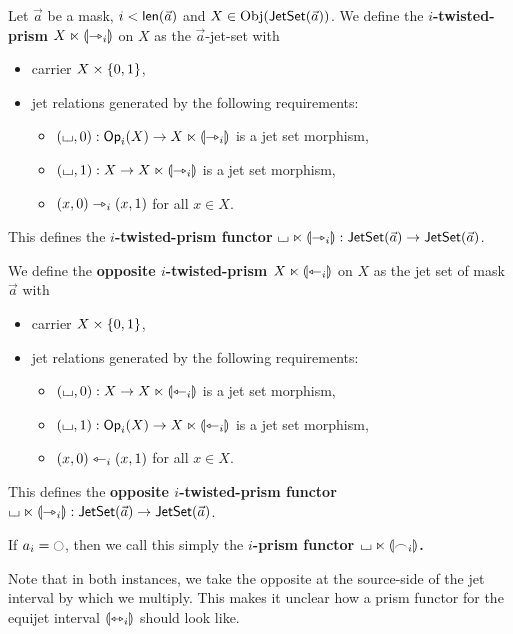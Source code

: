 \documentclass[a4paper]{article}
\begin{document}
\begin{definition} \label{def:prism}
	Let $\vec a$ be a mask, $i < \mathsf{len}(\vec a)$ and $X \in \mathrm{Obj}(\mathsf{JetSet}(\vec a))$.
	We define the \textbf{$i$-twisted-prism $X \ltimes {\llparenthesis \rightarrowtriangle_i \rrparenthesis}$} on $X$ as the $\vec a$-jet-set with
	\begin{itemize}
		\item carrier $X \times \mathopen{}\left\{ 0, 1 \right\}\mathclose{}$,
		\item jet relations generated by the following requirements:
		\begin{itemize}
			\item $({\llcorner\hspace{-.4ex}\lrcorner}, 0) : {\mathsf{Op}}_i(X) \to X \ltimes {\llparenthesis \rightarrowtriangle_i \rrparenthesis}$ is a jet set morphism,
			\item $({\llcorner\hspace{-.4ex}\lrcorner}, 1) : X \to X \ltimes {\llparenthesis \rightarrowtriangle_i \rrparenthesis}$ is a jet set morphism,
			\item $(x, 0) \rightarrowtriangle_i (x, 1)$ for all $x \in X$.
		\end{itemize}
	\end{itemize}
	This defines the \textbf{$i$-twisted-prism functor} ${\llcorner\hspace{-.4ex}\lrcorner} \ltimes {\llparenthesis \rightarrowtriangle_i \rrparenthesis} : \mathsf{JetSet}(\vec a) \to \mathsf{JetSet}(\vec a)$.
	
	We define the \textbf{opposite $i$-twisted-prism $X \ltimes {\llparenthesis \leftarrowtriangle_i \rrparenthesis}$} on $X$ as the jet set of mask $\vec a$ with
	\begin{itemize}
		\item carrier $X \times \mathopen{}\left\{ 0, 1 \right\}\mathclose{}$,
		\item jet relations generated by the following requirements:
		\begin{itemize}
			\item $({\llcorner\hspace{-.4ex}\lrcorner}, 0) : X \to X \ltimes {\llparenthesis \leftarrowtriangle_i \rrparenthesis}$ is a jet set morphism,
			\item $({\llcorner\hspace{-.4ex}\lrcorner}, 1) : {\mathsf{Op}}_i(X) \to X \ltimes {\llparenthesis \leftarrowtriangle_i \rrparenthesis}$ is a jet set morphism,
			\item $(x, 0) \leftarrowtriangle_i (x, 1)$ for all $x \in X$.
		\end{itemize}
	\end{itemize}
	This defines the \textbf{opposite $i$-twisted-prism functor} ${\llcorner\hspace{-.4ex}\lrcorner} \ltimes {\llparenthesis \rightarrowtriangle_i \rrparenthesis} : \mathsf{JetSet}(\vec a) \to \mathsf{JetSet}(\vec a)$.
	
	If $a_i = \npolar$, then we call this simply the \textbf{$i$-prism functor ${\llcorner\hspace{-.4ex}\lrcorner} \ltimes {\llparenthesis \frown_i \rrparenthesis}$.}
\end{definition}
Note that in both instances, we take the opposite at the source-side of the jet interval by which we multiply. This makes it unclear how a prism functor for the equijet interval ${\llparenthesis \leftrightarrowtriangle_i \rrparenthesis}$ should look like.
\end{document}
